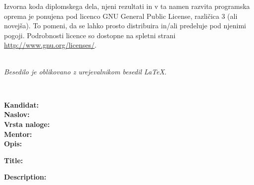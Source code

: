 \vspace*{1cm}
{\small \noindent
  Izvorna koda diplomskega dela, njeni rezultati in v ta namen razvita programska oprema je ponujena pod licenco GNU General Public License,
  različica 3 (ali novejša). To pomeni, da se lahko prosto distribuira in/ali predeluje pod njenimi pogoji.
  Podrobnosti licence so dostopne na spletni strani \url{http://www.gnu.org/licenses/}.
}

\vfill
\begin{center}
  \ \\ \vfill
  {\em
  Besedilo je oblikovano z urejevalnikom besedil \LaTeX.}
\end{center}

\clearemptydoublepage

\thispagestyle{empty}
\
\vfill

\bigskip
\noindent\textbf{Kandidat:} \tauthor\\
\noindent\textbf{Naslov:} \ttitle\\
\noindent\textbf{Vrsta naloge:} \tvrsta \\
\noindent\textbf{Mentor:} \tmentor \\

\bigskip
\noindent\textbf{Opis:}\\
\tdescription

\bigskip
\noindent\textbf{Title:} \ttitleEn

\bigskip
\noindent\textbf{Description:}\\
\tdescriptionEn

\vfill

\vspace{2cm}

\clearemptydoublepage

\thispagestyle{empty}\mbox{}\vfill\null\it%
\noindent
\tzahvala
\rm\normalfont

\clearemptydoublepage

\thispagestyle{empty}\mbox{}{\textheight}\mbox{}\hfill
\begin{minipage}{0.55\textwidth}%
  \tposvetilo
  \normalfont
\end{minipage}

\clearemptydoublepage

